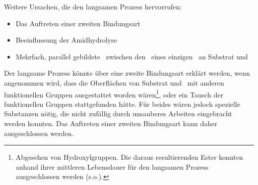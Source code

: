Weitere Ursachen, die den langsamen Prozess hervorrufen:

\begin{itemize}
	\item Das Auftreten einer zweiten Bindungsart
	\item Beeinflussung der Amidhydrolyse
	\item Mehrfach, parallel gebildete \amide~zwischen den \carboxys~eines einzigen \spacer~an Substrat und \spitze
\end{itemize}

\renewcommand{\noteOne}{Abgesehen von Hydroxylgruppen. Die daraus resultierenden Ester konnten anhand ihrer mittleren Lebensdauer für den langsamen Prozess ausgeschlossen werden (s.o.).}

\renewcommand{\noteTwo}{Die nukleophile Addition von \ch{H2O} an das Carbonylkohlenstoff ist die initiale Reaktion für die Hydrolyse. Diese Reaktion kann durch Säuren oder Basen beschleunigt werden 	\cite[288]{Latscha.2016}}

\renewcommand{\noteThree}{Die Reaktivität der Carbonsäurederivate beruht auf der Basizität des Substituenten. Je geringer die Basizität, desto stabiler ist das Derivat. Die Einteilung nach steigender Reaktivität lautet dabei wie folgt \cite[287]{Latscha.2016}:
	\scalebox{0.9}{
		\setchemfig{scheme debug = false}
		\setchemfig{angle increment=30}
		\definesubmol{rest}{R-[,0.75]C(=[2,0.75]O)-[-2,0.75]}
		\schemestart
		\chemname{
			\chemfig{!{rest}OH}
		}{Carbonsäure}
		\arrow(.base east--.base west){0}[,0]<\arrow(.base east--.base west){0}[,0.3]
		\chemname{
			\chemfig{!{rest}NH_2}
		}{-amid}
		\arrow(.base east--.base west){0}[,0]<\arrow(.base east--.base west){0}[,0.3]
		\chemname{
			\chemfig{!{rest}OR}
		}{-ester}
		\arrow(.base east--.base west){0}[,0]<\arrow(.base east--.base west){0}[,0.3]
		\chemname{
			\chemfig{!{rest}SR}
		}{-thioester}
		\arrow(.base east--.base west){0}[,0]<\arrow(.base east--.base west){0}[,0.3]
		\chemname{
			\chemfig{R-[,0.75]C(=[2,0.75]O)-[-1,0.75]O-[1,0.75]C(=[4,0.75]O)-[,0.75]R}
		}{-anhydrid}
		\arrow(.base east--.base west){0}[,0.3]<\arrow(.base east--.base west){0}[,0.3]
		\chemname{
			\chemfig{!{rest}Cl}
		}{-chlorid}
		\schemestop
	}
}

Der langsame Prozess könnte über eine zweite Bindungsart erklärt werden, wenn angenommen wird, dass die Oberflächen von Substrat und \spitzen~mit anderen funktionellen Gruppen ausgestattet worden wären\footnote{\noteOne}, oder ein Tausch der funktionellen Gruppen stattgefunden hätte. Für beides wären jedoch spezielle Substanzen nötig, die nicht zufällig durch unsauberes Arbeiten eingebracht werden konnten. Das Auftreten einer zweiten Bindungsart kann daher ausgeschlossen werden.\\

